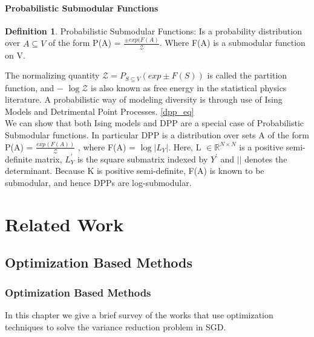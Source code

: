 \documentclass[a4paper,twoside]{iiththesis}
\theoremstyle{definition}
\newtheorem{definition}{Definition}[section]
\theoremstyle{definition}
\theoremstyle{remark}
\begin{document}
\subsection{Probabilistic Submodular Functions}
\begin{definition}Probabilistic Submodular Functions: 
Is a probability distribution over $A \subseteq V$  of the form P(A) = $\frac{\pm exp(F(A)}{\mathcal{Z}}$. Where F(A) is a submodular function on V.
\end{definition}

  The normalizing quantity $\mathcal{Z} = P_{S\subseteq V} (exp \pm  F(S))$ is called the partition function, and − $\log \mathcal{Z}$ is also known as free energy in the statistical physics literature. 
A probabilistic way of modeling diversity is through use of Ising Models and Detrimental Point Processes. \ref{dpp_eq}\\
We can show that both Ising models and DPP are a special case of Probabilistic Submodular functions. 
In particular DPP is a distribution over sets A of the form
P(A) = $\frac{exp(F(A))}{\mathcal{Z}}$ , where F(A) = $\log |L_Y|$. Here, L $\in \mathbb{R}
^{N \times N}$ is a positive semi-definite matrix, $L_Y^{'}$ is the square submatrix indexed by $Y^{'}$ and $|   |$ denotes the determinant. Because K is positive semi-definite, F(A) is known to be submodular, and hence DPPs are log-submodular.

\part{Related Work}
\chapter{Optimization Based Methods}
\section{Optimization Based Methods}
In this chapter we give a brief survey of the works that use optimization techniques to solve the variance reduction problem in SGD.\\
\end{document}
